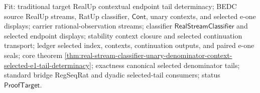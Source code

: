 
Fit: traditional target RealUp contextual endpoint tail determinacy; BEDC
source RealUp streams, RatUp classifier, $\mathsf{Cont}$, unary contexts, and
selected e-one displays; carrier rational-observation streams; classifier
$\mathsf{RealStreamClassifier}$ and selected endpoint displays; stability
context closure and selected continuation transport; ledger selected index,
contexts, continuation outputs, and paired e-one seals; core theorem
\autoref{thm:real-stream-classifier-unary-denominator-context-selected-e1-tail-determinacy};
exactness canonical selected denominator tails; standard bridge RegSeqRat and
dyadic selected-tail consumers; status $\mathsf{ProofTarget}$.

